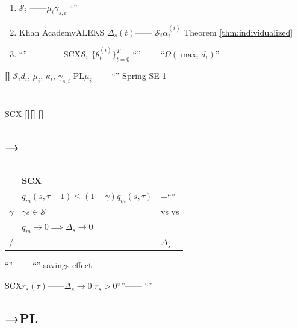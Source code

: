\documentclass[11pt,a4paper]{article}
\theoremstyle{remark}
\newcommand{\Sstates}{\mathcal{S}}
\newcommand{\rigorous}{\textnormal{\textbf{[]}}}
\newcommand{\heuristic}{\textnormal{\textbf{[]}}}
\newcommand{\metaphor}{\textnormal{\textbf{[]}}}
\begin{document}
\textbf{}

\begin{enumerate}[label=(\arabic*)]
    \item \textbf{}$\Sstates_i$
          ——$\mu_i$$\gamma_{s,i}$
          ``''
    \item \textbf{}Khan AcademyALEKS
          $\Delta_s(t)$——
          $\Sstates_i$$\alpha_t^{(i)}$
          Theorem \ref{thm:individualized}
    \item \textbf{}``''————
          SCX$\Sstates_i$
          $\{\theta_t^{(i)}\}_{t=0}^{T}$
          ``''——
          ``$\Omega(\max_i d_i)$''
\end{enumerate}

\heuristic{} \textbf{}$\Sstates_i$$d_i$, $\mu_i$, $\kappa_i$, $\gamma_{s,i}$
PL$\mu_i$——
``''
Spring SE-1

\section{}

SCX
\rigorous{}\heuristic{}
\metaphor{}

\subsection{→}

\begin{table}[htbp]
\centering
\caption{}
\label{tab:economy_audit}
\begin{tabular}{@{}p{3.5cm}p{6cm}p{5cm}@{}}
\toprule
\textbf{} & \textbf{SCX} & \textbf{} \\
\midrule
 &
$q_m(s, \tau+1) \leq (1-\gamma)q_m(s,\tau)$ &
+``''\\
\midrule
$\gamma$ &
$\gamma$$s \in \Sstates$ &
 vs  vs \\
\midrule
 &
$q_m \to 0 \implies \Delta_s \to 0$ &
\\
\midrule
/ &
 &
$\Delta_s$\\
\bottomrule
\end{tabular}
\end{table}

\textbf{}``''\textbf{}——
``''
\textbf{}savings effect——

SCX\textbf{}$r_s(\tau)$——$\Delta_s \to 0$
$r_s > 0$``''——
``''

\subsection{→PL}
\end{document}
